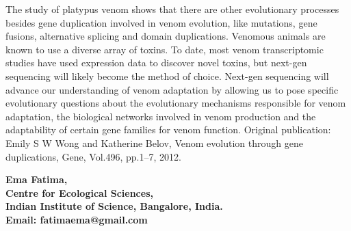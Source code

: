 \documentclass{resoResearch}
\begin{document}
\begin{multicols}{2}
The study of platypus venom
shows that there
are other evolutionary processes besides gene
duplication involved in venom evolution, like
mutations,  gene fusions,  alternative  splicing
and domain duplications. Venomous animals
are known to use a diverse array of toxins. To
date, most venom transcriptomic studies have
used expression data to discover novel toxins,
but  next-gen  sequencing  will  likely  become
the  method  of  choice.  Next-gen  sequencing
will advance our understanding of venom adaptation by allowing us to pose specific evolutionary  questions  about  the  evolutionary
mechanisms  responsible  for  venom  adaptation,  the  biological  networks  involved  in
venom production and the adaptability of certain gene families for venom function.
Original publication: Emily S  W Wong  and
Katherine  Belov,  Venom  evolution  through
gene  duplications,
Gene,  Vol.496,  pp.1–7,
2012.



\hrulefill

\sffamily\bfseries\footnotesize Ema Fatima,\\ Centre for Ecological Sciences,\\ 
Indian Institute of  Science,  Bangalore,  India.\\
Email:  fatimaema@gmail.com
\end{multicols}
\end{document}
